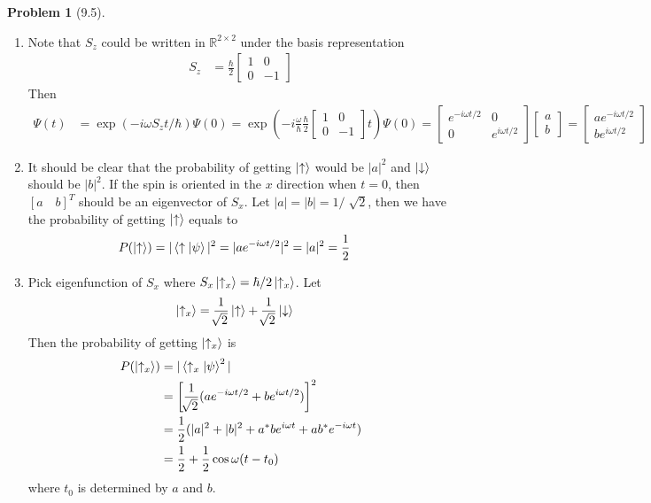 \documentclass[twoside,11pt]{article}
\newcommand{\RR}{\mathbb{R}}
\theoremstyle{definition}
\newtheorem{problem}{Problem}
\theoremstyle{remark}
\begin{document}
\begin{problem}[9.5]
\begin{enumerate}[label=(\alph*)]
\item Note that $S_z$ could be written in $\RR^{2\times 2}$
under the basis representation
\begin{align*}
    S_z &= \frac{\hbar}{2}\begin{bmatrix}
        1 & 0 \\ 0 & -1
    \end{bmatrix}
\end{align*}
Then
\begin{align*}
    \Psi(t) &= \exp(-i\omega S_zt/\hbar)\Psi(0)
    = \exp\left(
        -i\frac{\omega}{\hbar}\frac{\hbar}{2}\begin{bmatrix}
            1 & 0 \\ 0 & -1
        \end{bmatrix}t
    \right)\Psi(0)
    = \begin{bmatrix}
        e^{-i\omega t/2} & 0\\ 0 & e^{i\omega t/2}
    \end{bmatrix}\begin{bmatrix}
        a\\b
    \end{bmatrix}
    =
    \begin{bmatrix}
        ae^{-i\omega t/2}\\
        be^{i\omega t/2}
    \end{bmatrix}
\end{align*}

\item It should be clear that the probability of getting
$\ket{\uparrow}$ would be $|a|^2$ and $\ket{\downarrow}$ should
be $|b|^2$.
If the spin is oriented in the $x$ direction when $t=0$, 
then $[a\quad b]^T$ should be an eigenvector of $S_x$.
Let $|a|=|b|=1/\sqrt[]{2}$, then we have the probability
of getting $\ket{\uparrow}$ equals to 
\begin{align*}
    P(\ket{\uparrow}) &= |\braket{\uparrow|\psi}|^2 = |ae^{-i\omega t/2}|^2 = |a|^2 = \frac{1}{2}
\end{align*}

\item Pick eigenfunction of $S_x$ where $S_x\ket{\uparrow_x} = \hbar/2\ket{\uparrow_x}$.
Let
\begin{align*}
    \ket{\uparrow_x} &= \frac{1}{\sqrt[]{2}}\ket{\uparrow} + \frac{1}{\sqrt[]{2}}\ket{\downarrow}
\end{align*}
Then the probability of getting $\ket{\uparrow_x}$ is
\begin{align*}
    P(\ket{\uparrow_x}) &= |\braket{\uparrow_x|\psi}^2|\\
    &= 
    \left[\frac{1}{\sqrt[]{2}}(ae^{-i\omega t/2} + be^{i\omega t/2})\right]^2\\
    &= \frac{1}{2}(|a|^2 + |b|^2 + a^*be^{i\omega t}+ab^*e^{-i\omega t})\\
    &= \frac{1}{2} + \frac{1}{2}\cos\omega (t-t_0)
\end{align*}
where $t_0$ is determined by $a$ and $b$.


\end{enumerate}
\end{problem}
\end{document}
